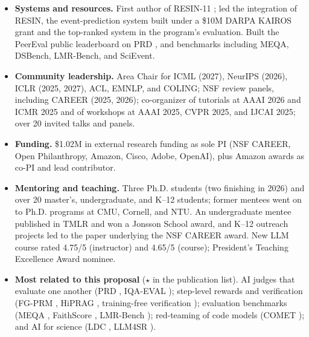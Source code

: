 \begin{itemize}[leftmargin=10pt, label=\textbullet, itemsep=1pt, parsep=0pt, topsep=0pt]
\item \textbf{Systems and resources.} First author of RESIN-11 ; led the integration of RESIN, the event-prediction system built under a \$10M DARPA KAIROS grant and the top-ranked system in the program's evaluation. Built the PeerEval public leaderboard on PRD , and benchmarks including MEQA, DSBench, LMR-Bench, and SciEvent.
\item \textbf{Community leadership.} Area Chair for ICML (2027), NeurIPS (2026), ICLR (2025, 2027), ACL, EMNLP, and COLING; NSF review panels, including CAREER (2025, 2026); co-organizer of tutorials at AAAI 2026 and ICMR 2025 and of workshops at AAAI 2025, CVPR 2025, and IJCAI 2025; over 20 invited talks and panels.
\item \textbf{Funding.} \$1.02M in external research funding as sole PI (NSF CAREER, Open Philanthropy, Amazon, Cisco, Adobe, OpenAI), plus Amazon awards as co-PI and lead contributor.
\item \textbf{Mentoring and teaching.} Three Ph.D. students (two finishing in 2026) and over 20 master's, undergraduate, and K--12 students; former mentees went on to Ph.D. programs at CMU, Cornell, and NTU. An undergraduate mentee published in TMLR and won a Jonsson School award, and K--12 outreach projects led to the paper underlying the NSF CAREER award. New LLM course rated 4.75/5 (instructor) and 4.65/5 (course); President's Teaching Excellence Award nominee.
\item \textbf{Most related to this proposal} ($\star$ in the publication list). AI judges that evaluate one another (PRD , IQA-EVAL ); step-level rewards and verification (FG-PRM , HiPRAG , training-free verification ); evaluation benchmarks (MEQA , FaithScore , LMR-Bench ); red-teaming of code models (COMET ); and AI for science (LDC , LLM4SR ).
\end{itemize}
